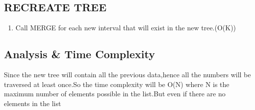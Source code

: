 \documentclass[12pt]{article}
\begin{document}
\subsection*{RECREATE TREE}
\begin{enumerate}
	\item Call MERGE for each new interval that will exist in the new tree.(O(K))
\end{enumerate}
\subsection*{Analysis & Time Complexity}
Since the new tree will contain all the previous data,hence all the numbers will be traversed at least once.So the time complexity will be O(N) where N is the maximum number of elements possible in the list.But even if there are no elements in the list 
\end{document}
